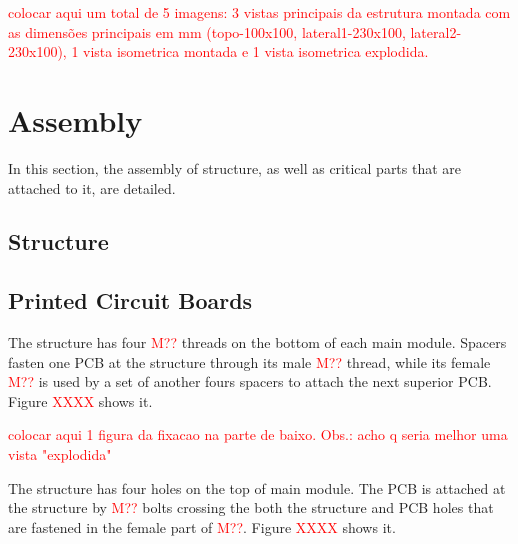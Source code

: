 \textcolor{red}{colocar aqui um total de 5 imagens: 3 vistas principais da estrutura montada com as dimensões principais em mm (topo-100x100, lateral1-230x100, lateral2-230x100), 1 vista isometrica montada e 1 vista isometrica explodida.}



\section{Assembly}

In this section, the assembly of structure, as well as critical parts that are attached to it, are detailed.

\subsection{Structure}

\subsection{Printed Circuit Boards}

The structure has four \textcolor{red}{M??} threads on the bottom of each main module. Spacers fasten one PCB at the structure through its male \textcolor{red}{M??} thread, while its female \textcolor{red}{M??} is used by a set of another fours spacers to attach the next superior PCB. Figure \textcolor{red}{XXXX} shows it.

\textcolor{red}{colocar aqui 1 figura da fixacao na parte de baixo. Obs.: acho q seria melhor uma vista "explodida"}

The structure has four holes on the top of main module. The PCB is attached at the structure by \textcolor{red}{M??} bolts crossing the both the structure and PCB holes that are fastened in the female part of \textcolor{red}{M??}. Figure \textcolor{red}{XXXX} shows it.


